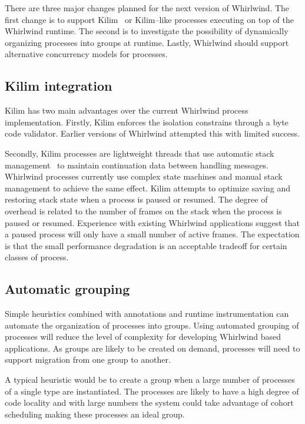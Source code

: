 \documentclass[conference]{IEEEtran}
\begin{document}
There are three major changes planned for the next version of Whirlwind. The first change is to support Kilim~\cite{Srinivasan:08:Kilim} or Kilim--like processes executing on top of the Whirlwind runtime. The second is to investigate the possibility of dynamically organizing processes into groups at runtime. Lastly, Whirlwind should support alternative concurrency models for processes.

\subsection{Kilim integration}

Kilim has two main advantages over the current Whirlwind process implementation. Firstly, Kilim enforces the isolation constrains through a byte code validator. Earlier versions of Whirlwind attempted this with limited success. 

Secondly, Kilim processes are lightweight threads that use automatic stack management~\cite{Adya02Cooperative} to maintain continuation data between handling messages. 
Whirlwind processes currently use complex state machines and manual stack management to achieve the same effect. Kilim attempts to optimize saving and restoring stack state when a process is paused or resumed. The degree of overhead is related to the number of frames on the stack when the process is paused or resumed. Experience with existing Whirlwind applications suggest that a paused process will only have a small number of active frames. The expectation is that the small performance degradation is an acceptable tradeoff for certain classes of process.

\subsection{Automatic grouping}

Simple heuristics combined with annotations and runtime instrumentation can automate the organization of processes into groups. Using automated grouping of processes will reduce the level of complexity for developing Whirlwind based applications. As groups are likely to be created on demand, processes will need to support migration from one group to another.

A typical heuristic would be to create a group when a large number of processes of a single type are instantiated. The processes are likely to have a high degree of code locality and with large numbers the system could take advantage of cohort scheduling making these processes an ideal group.
\end{document}
